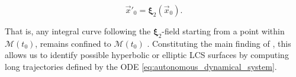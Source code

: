 \begin{equation}\label{eq:autonomous_dynamical_system}
\vec{x}'_0=\bm{\xi}_2(\vec{x}_0).
\end{equation}

\noindent That is, any integral curve following the $\bm{\xi}_2$-field starting from a point within $\mathcal{M}(t_0)$, remains confined to $\mathcal{M}(t_0)$ \citep{Oettinger}. Constituting the main finding of \cite{Oettinger}, this allows us to identify possible hyperbolic or elliptic LCS surfaces by computing long trajectories defined by the ODE \eqref{eq:autonomous_dynamical_system}.




